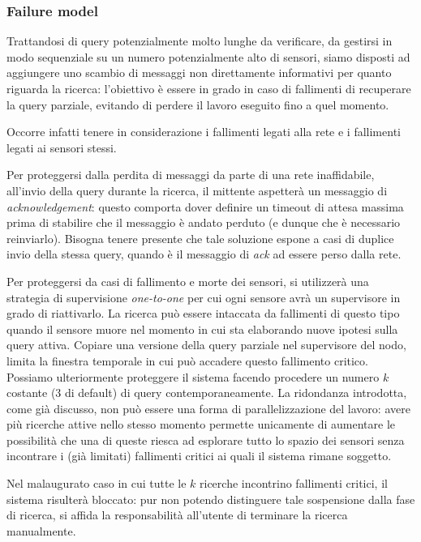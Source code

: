 \documentclass{llncs}
\begin{document}
\subsubsection*{Failure model}
Trattandosi di query potenzialmente molto lunghe da verificare,
da gestirsi in modo sequenziale su un numero potenzialmente alto di sensori,
siamo disposti ad aggiungere uno scambio di messaggi non direttamente
informativi per quanto riguarda la ricerca: l'obiettivo è essere in grado
in caso di fallimenti di recuperare la query parziale,
evitando di perdere il lavoro eseguito fino a quel momento.

Occorre infatti tenere in considerazione i fallimenti legati alla rete e i
fallimenti legati ai sensori stessi.

Per proteggersi dalla perdita di messaggi da parte di una rete inaffidabile,
all'invio della query durante la ricerca, il mittente aspetterà un messaggio
di \emph{acknowledgement}: questo comporta dover definire un timeout
di attesa massima prima di stabilire che il messaggio è andato perduto
(e dunque che è necessario reinviarlo).
Bisogna tenere presente che
tale soluzione espone a casi di duplice invio della stessa query,
quando è il messaggio di \emph{ack} ad essere perso dalla rete.

Per proteggersi da casi di fallimento e morte dei sensori,
si utilizzerà una strategia di supervisione \emph{one-to-one}
per cui ogni sensore avrà un supervisore in grado di riattivarlo.
La ricerca può essere intaccata da fallimenti di questo tipo
quando il sensore muore nel momento in cui sta elaborando
nuove ipotesi sulla query attiva.
Copiare una versione della query parziale nel supervisore del nodo,
limita la finestra temporale in cui può accadere questo fallimento
critico.
Possiamo ulteriormente proteggere il sistema facendo procedere
un numero $k$ costante (3 di default) di query contemporaneamente.
La ridondanza introdotta, come già discusso,
non può essere una forma di parallelizzazione del lavoro: avere
più ricerche attive nello stesso momento permette unicamente di
aumentare le possibilità che una di queste riesca ad esplorare
tutto lo spazio dei sensori senza incontrare i (già limitati)
fallimenti critici ai quali il sistema rimane soggetto.

Nel malaugurato caso in cui tutte le $k$ ricerche incontrino
fallimenti critici, il sistema risulterà bloccato: pur non potendo
distinguere tale sospensione dalla fase di ricerca, si affida
la responsabilità all'utente di terminare la ricerca manualmente.
\end{document}
